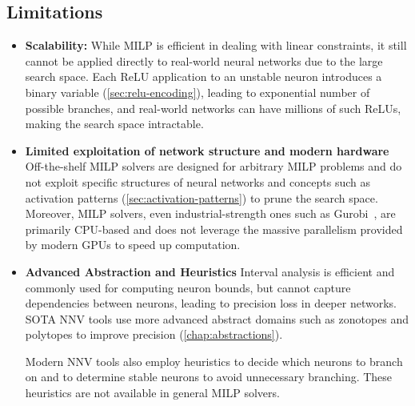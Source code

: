 \documentclass[oneside,11pt,dvipsnames]{book}
\numberwithin{equation}{section}
\theoremstyle{definition}
\theoremstyle{remark}
\begin{document}
\subsection{Limitations}\label{sec:milp-limitations}


\begin{itemize}
    \item \textbf{Scalability:} While MILP is efficient in dealing with linear constraints, it still cannot be applied directly to real-world neural networks due to the large search space. Each ReLU application to an unstable neuron introduces a binary variable (\autoref{sec:relu-encoding}), leading to exponential number of possible branches, and real-world networks can have millions of such ReLUs, making the search space intractable.

    \item \textbf{Limited exploitation of network structure and modern hardware} Off-the-shelf MILP solvers are designed for arbitrary MILP problems and do not exploit specific structures of neural networks and concepts such as activation patterns (\autoref{sec:activation-patterns}) to prune the search space.
    Moreover, MILP solvers, even industrial-strength ones such as Gurobi~\cite{gurobi}, are primarily CPU-based and does not leverage the massive parallelism provided by modern GPUs to speed up computation.


    \item \textbf{Advanced Abstraction and Heuristics} Interval analysis is efficient and commonly used for computing neuron bounds, but cannot capture dependencies between neurons, leading to precision loss in deeper networks. SOTA NNV tools use more advanced abstract domains such as zonotopes  and polytopes to improve precision (\autoref{chap:abstractions}).

    Modern NNV tools also employ heuristics to decide which neurons to branch on and to determine stable neurons to avoid unnecessary branching. These heuristics are not available in general MILP solvers.
\end{itemize}
\end{document}
